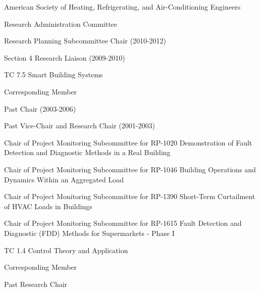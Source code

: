 

\begin{cventries}

\cvmultientry
{American Society of Heating, Refrigerating, and Air-Conditioning Engineers} %
{}
{} %
{
\cvsubentry
{Research Administration Committee} %
{} %
{} %
{
\begin{cvitems} %
\item {Research Planning Subcommittee Chair (2010-2012)}
\item {Section 4 Research Liaison (2009-2010)}
\end{cvitems}
}%
\cvsubentry
{TC 7.5 Smart Building Systems} %
{} %
{} %
{
\begin{cvitems} %
\item {Corresponding Member}
\item {Past Chair (2003-2006)}
\item {Past Vice-Chair and Research Chair (2001-2003)}
\item {Chair of Project Monitoring Subcommittee for RP-1020 Demonstration of Fault Detection and Diagnostic Methods in a Real Building}
\item {Chair of Project Monitoring Subcommittee for RP-1046 Building Operations and Dynamics Within an Aggregated Load}
\item {Chair of Project Monitoring Subcommittee for RP-1390 Short-Term Curtailment of HVAC Loads in Buildings}
\item {Chair of Project Monitoring Subcommittee for RP-1615 Fault Detection and Diagnostic (FDD) Methods for Supermarkets - Phase I} 
\end{cvitems}
}%
\cvsubentry
{TC 1.4 Control Theory and Application} %
{} %
{} %
{
\begin{cvitems} %
\item {Corresponding Member}
\item {Past Research Chair}
\end{cvitems}
}
}

\end{cventries}
